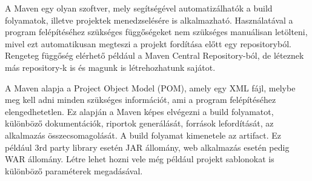 A Maven egy olyan szoftver, mely segítségével automatizálhatók a build folyamatok, illetve projektek menedzselésére is alkalmazható. Használatával a program felépítéséhez szükséges függőségeket nem szükséges manuálisan letölteni, mivel ezt automatikusan megteszi a projekt fordítása előtt egy repositoryból. Rengeteg függőség elérhető például a Maven Central Repository-ból, de léteznek más repository-k is és magunk is létrehozhatunk sajátot. 

A Maven alapja a Project Object Model (POM), amely egy XML fájl, melybe meg kell adni minden szükséges információt, ami a program felépítéséhez elengedhetetlen. Ez alapján a Maven képes elvégezni a build folyamatot, különböző dokumentációk, riportok generálását, források lefordítását, az alkalmazás összecsomagolását. A build folyamat kimenetele az artifact. Ez például 3rd party library esetén JAR állomány, web alkalmazás esetén pedig WAR állomány. Létre lehet hozni vele még például projekt sablonokat is különböző paraméterek megadásával. 